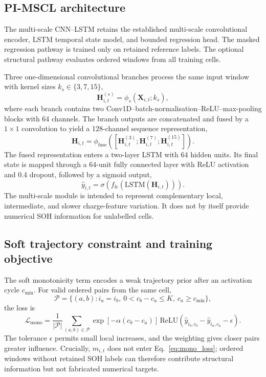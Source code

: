 \documentclass[pdflatex,sn-mathphys-num]{sn-jnl}
\begin{document}
\subsection{PI-MSCL architecture}
\label{subsec:architecture}

The multi-scale CNN--LSTM retains the established multi-scale convolutional encoder, LSTM temporal state model, and bounded regression head. The masked regression pathway is trained only on retained reference labels. The optional structural pathway evaluates ordered windows from all training cells.

Three one-dimensional convolutional branches process the same input window with kernel sizes $k_s\in\{3,7,15\}$,
\begin{equation}
\mathbf{H}_{i,t}^{(s)}=\phi_s(\mathbf{X}_{i,t};k_s),
\end{equation}
where each branch contains two Conv1D--batch-normalisation--ReLU--max-pooling blocks with 64 channels. The branch outputs are concatenated and fused by a $1\times1$ convolution to yield a 128-channel sequence representation,
\begin{equation}
\mathbf{H}_{i,t}=\phi_{\mathrm{fuse}}([\mathbf{H}_{i,t}^{(3)};\mathbf{H}_{i,t}^{(7)};\mathbf{H}_{i,t}^{(15)}]).
\label{eq:multiscale_fusion}
\end{equation}
The fused representation enters a two-layer LSTM with 64 hidden units. Its final state is mapped through a 64-unit fully connected layer with ReLU activation and 0.4 dropout, followed by a sigmoid output,
\begin{equation}
\hat{y}_{i,t}=\sigma\left(f_{\mathrm{fc}}(\mathrm{LSTM}(\mathbf{H}_{i,t}))\right).
\label{eq:prediction}
\end{equation}
The multi-scale module is intended to represent complementary local, intermediate, and slower charge-feature variation. It does not by itself provide numerical SOH information for unlabelled cells.

\subsection{Soft trajectory constraint and training objective}
\label{subsec:loss}

The soft monotonicity term encodes a weak trajectory prior after an activation cycle $c_{\min}$. For valid ordered pairs from the same cell,
\begin{equation}
\mathcal{P}=\{(a,b): i_a=i_b,\ 0<c_b-c_a\leq K,\ c_a\geq c_{\min}\},
\end{equation}
the loss is
\begin{equation}
\mathcal{L}_{\mathrm{mono}}=\frac{1}{|\mathcal{P}|}\sum_{(a,b)\in\mathcal{P}}\exp[-\alpha(c_b-c_a)]\,\mathrm{ReLU}(\hat{y}_{i_b,c_b}-\hat{y}_{i_a,c_a}-\epsilon).
\label{eq:mono_loss}
\end{equation}
The tolerance $\epsilon$ permits small local increases, and the weighting gives closer pairs greater influence. Crucially, $m_{i,t}$ does not enter Eq.~\eqref{eq:mono_loss}; ordered windows without retained SOH labels can therefore contribute structural information but not fabricated numerical targets.
\end{document}
